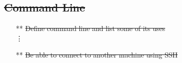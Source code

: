 \documentclass[12pt]{article}%
\begin{document}
\subsection*{\st{Command Line}}
\begin{itemize}
 \setlength{\itemsep}{1pt}%
    \setlength{\parskip}{1pt}
\item[**] \st{Define command line and list some of its uses}\\
\vdots
\item[**] \st{Be able to connect to another machine using SSH}
\end{itemize}
\end{document}
